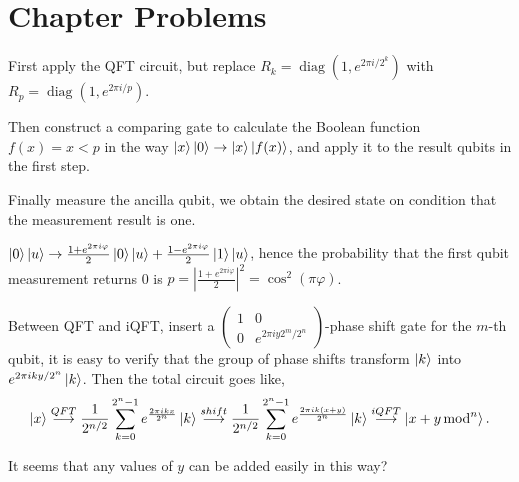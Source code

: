 \section*{Chapter Problems}

\prob First apply the QFT circuit, but replace $R_k=\operatorname{diag}(1, e^{2\pi i/2^k})$ with $R_p=\operatorname{diag}(1, e^{2\pi i/p})$.

Then construct a comparing gate to calculate the Boolean function $f(x) = x < p$ in the way $\left|x\right\rangle\left|0\right\rangle\rightarrow\left|x\right\rangle\left|f(x)\right\rangle$, and apply it to the result qubits in the first step.

Finally measure the ancilla qubit, we obtain the desired state on condition that the measurement result is one.

\prob \todo

\prob $\left|0\right\rangle\left|u\right\rangle \rightarrow \frac{1+e^{2\pi i\varphi}}{2}\left|0\right\rangle\left|u\right\rangle+\frac{1-e^{2\pi i\varphi}}{2}\left|1\right\rangle\left|u\right\rangle$, hence the probability that the first qubit measurement returns 0 is $p=\left|\frac{1+e^{2\pi i\varphi}}{2}\right|^2=\cos^2(\pi\varphi)$. \todo

\prob \todo

\prob \todo

\prob Between QFT and iQFT, insert a $\begin{pmatrix}
    1 & 0 \\
    0 & e^{2\pi iy2^m/2^n}
\end{pmatrix}$-phase shift gate for the $m$-th qubit, it is easy to verify that the group of phase shifts transform $\left|k\right\rangle$ into $e^{2\pi iky/2^n}\left|k\right\rangle$.
Then the total circuit goes like,
$$
\left|x\right\rangle 
\overset{QFT}{\longrightarrow} 
\frac{1}{2^{n/2}}\sum_{k=0}^{2^n-1}e^{\frac{2\pi ikx}{2^n}}\left|k\right\rangle 
\overset{shift}{\longrightarrow} 
\frac{1}{2^{n/2}}\sum_{k=0}^{2^n-1}e^{\frac{2\pi ik(x+y)}{2^n}}\left|k\right\rangle 
\overset{iQFT}{\longrightarrow} 
\left|x+y\operatorname{ mod }^n\right\rangle.
$$

\redstar It seems that any values of $y$ can be added easily in this way?
